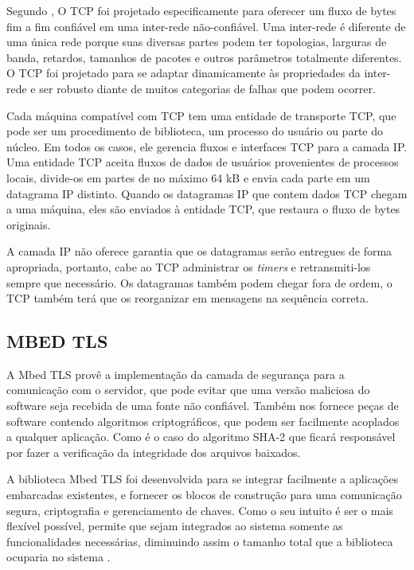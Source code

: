 Segundo , O TCP foi projetado especificamente para oferecer um fluxo de bytes fim a fim confiável em uma inter-rede não-confiável. Uma inter-rede é diferente de uma única rede porque suas diversas partes podem ter topologias, larguras de banda, retardos, tamanhos de pacotes e outros parâmetros totalmente diferentes. O TCP foi projetado para se adaptar dinamicamente às propriedades da inter-rede e ser robusto diante de muitos categorias de falhas que podem ocorrer.

Cada máquina compatível com TCP tem uma entidade de transporte TCP, que pode ser um procedimento de biblioteca, um processo do usuário ou parte do núcleo. Em todos os casos, ele gerencia fluxos e interfaces TCP para a camada IP. Uma entidade TCP aceita fluxos de dados de usuários provenientes de processos locais, divide-os em partes de no máximo 64 kB e envia cada parte em um datagrama IP distinto. Quando os datagramas IP que contem dados TCP chegam a uma máquina, eles são enviados à entidade TCP, que restaura o fluxo de bytes originais.

A camada IP não oferece garantia que os datagramas serão entregues de forma apropriada, portanto, cabe ao TCP administrar os \textit{timers} e retransmiti-los sempre que necessário. Os datagramas também podem chegar fora de ordem, o TCP também terá que os reorganizar em mensagens na sequência correta.



\subsection{MBED TLS}
A Mbed TLS provê a implementação da camada de segurança para a comunicação com o servidor, que pode evitar que uma versão maliciosa do software seja recebida de uma fonte não confiável. Também nos fornece peças de software contendo algoritmos criptográficos, que podem ser facilmente acoplados a qualquer aplicação. Como é o caso do algoritmo SHA-2 que ficará responsável por fazer a verificação da integridade dos arquivos baixados.

A biblioteca Mbed TLS foi desenvolvida para se integrar facilmente a aplicações embarcadas existentes, e fornecer os blocos de construção para uma comunicação segura, criptografia e gerenciamento de chaves. Como o seu intuito é ser o mais flexível possível, permite que sejam integrados ao sistema somente as funcionalidades necessárias, diminuindo assim o tamanho total que a biblioteca ocuparia no sistema \cite{mbedtls}.

